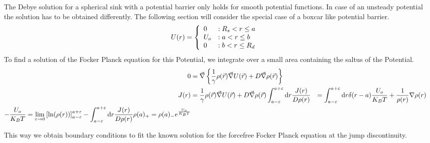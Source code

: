 The Debye solution for a spherical sink with a potential barrier only holds for smooth potential functions. In case of an unsteady potential the solution has to be obtained differently. The following section will consider the special case of a boxcar like potential barrier.
\begin{equation}
    U(r) = \left\{ \begin{array}{l l} 
        0 &: R_s < r \le a \\
        U_o &: a<r \le b \\
        0 &: b < r \le R_d
    \end{array} \right.
    \label{Boxcar_Potential}
\end{equation}
To find a solution of the Focker Planck equation for this Potential, we integrate over a small area containing the saltus of the Potential. 
\begin{align}
    0 &= \vec{\nabla} \left\{ \frac{1}{\gamma} \rho(\vec{r}) \vec{\nabla} U(\vec{r}) + D \vec{\nabla} \rho(\vec{r}) \right\} \\
    J(r) &=  \frac{1}{\gamma} \rho(\vec{r}) \vec{\nabla} U(\vec{r}) + D \vec{\nabla} \rho(\vec{r})
    \int_{a - \varepsilon}^{a + \varepsilon} {\rm d} r \frac{J(r)}{D\rho(r)} &= \int_{a - \varepsilon}^{a + \varepsilon} {\rm d} r \delta(r - a) \frac{U_o}{K_B T} + \frac{1}{\rho(r)} \nabla \rho(r) \\
    -\frac{U_o}{K_B T} = \lim_{\varepsilon \rightarrow 0} \left[ \ln (\rho(r) ) \right]_{a - \varepsilon}^{a + \varepsilon} - \int_{a - \varepsilon}^{a + \varepsilon} {\rm d} r \frac{J(r)}{D\rho(r)}
    \rho(a)_{+} = \rho(a)_{-} e^{\frac{U_o}{K_B T}}
    \label{Boxcar_BC}
\end{align}

This way we obtain boundary conditions to fit the known solution for the forcefree Focker Planck equation at the jump discontinuity.
